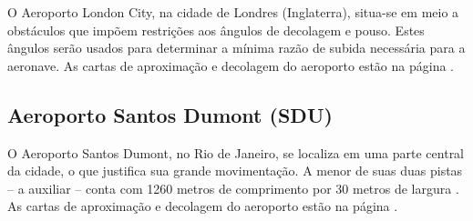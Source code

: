 O Aeroporto London City, na cidade de Londres (Inglaterra), situa-se em meio a obstáculos que impõem restrições aos ângulos de decolagem e pouso.
Estes ângulos serão usados para determinar a mínima razão de subida necessária para a aeronave.
As cartas de aproximação e decolagem do aeroporto estão na página \pageref{anexoB}.

\subsection{Aeroporto Santos Dumont (SDU)}

O Aeroporto Santos Dumont, no Rio de Janeiro, se localiza em uma parte central da cidade, o que justifica sua grande movimentação.
A menor de suas duas pistas -- a auxiliar -- conta com 1260 metros de comprimento por 30 metros de largura \cite{AISWEB:aerodromos}.
As cartas de aproximação e decolagem do aeroporto estão na página \pageref{anexoB}.
